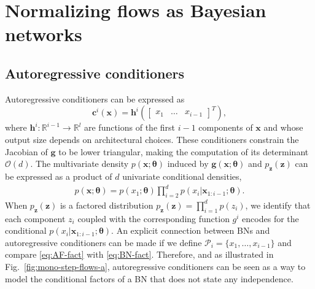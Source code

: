 \documentclass{article}
\newcommand{\mc}{\mathcal}
\newcommand{\mb}{\boldsymbol}
\newcommand{\figref}[1]{Fig.~\ref{#1}}
\begin{document}
\section{Normalizing flows as Bayesian networks}
\subsection{Autoregressive conditioners}
Autoregressive conditioners can be expressed as 
$$\mb{c}^i(\mb{x}) = \mb{h}^i\left(\begin{bmatrix} x_1 & \hdots & x_{i-1} \end{bmatrix}^T\right),$$ where $\mb{h}^i: \mathbb{R}^{i-1} \rightarrow \mathbb{R}^l$ are functions of the first $i-1$ components of $\mb{x}$ and whose output size depends on architectural choices.
These conditioners constrain the Jacobian of $\mb{g}$ to be lower triangular, making the computation of its determinant $\mc{O}(d)$. 
The multivariate density $p(\mb{x}; \mb{\theta})$ induced by $\mb{g}(\mb{x};\mb{\theta})$ and $p_{\mb{z}}(\mb{z})$ can be expressed as a product of $d$ univariate conditional densities, 
\begin{align}
    p(\mb{x}; \mb{\theta}) = p(x_1; \mb{\theta})\prod^{d}_{i=2}p(x_{i}|\mb{x}_{1:i-1}; \mb{\theta}). \label{eq:AF-fact}
\end{align}
When $p_{\mb{z}}(\mb{z})$ is a factored distribution $p_{\mb{z}}(\mb{z}) = \prod^{d}_{i=1}p(z_i)$, we identify that each component $z_i$ coupled with the corresponding function $g^i$ encodes for the conditional $p(x_{i}|\mb{x}_{1:i-1}; \mb{\theta})$. 
An explicit connection between BNs and autoregressive conditioners can be made if we define $\mathcal{P}_i = \{x_1, \hdots, x_{i-1}\}$ and compare \eqref{eq:AF-fact} with \eqref{eq:BN-fact}.  Therefore, and as illustrated in \figref{fig:mono-step-flows-a}, autoregressive conditioners can be seen as a way to model the conditional factors of a BN that does not state any independence. 
\end{document}
